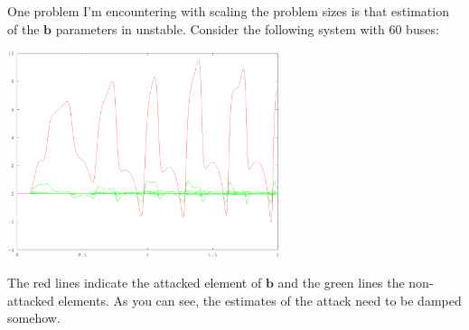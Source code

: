 \documentclass{article}
\newcommand{\bb}{\mathbf{b}}
\begin{document}
One problem I'm encountering with scaling the problem sizes is that estimation of the $\bb$ parameters in unstable.
Consider the following system with 60 buses:
\begin{center}
\includegraphics[width=0.6\textwidth,trim=0 2in 0 2in,clip]{img/ring-30-10-localSpike-gaussian-Observed-localKL-2-ukf}
\end{center}
The red lines indicate the attacked element of $\bb$ and the green lines the non-attacked elements.
As you can see, the estimates of the attack need to be damped somehow.



\end{document}
